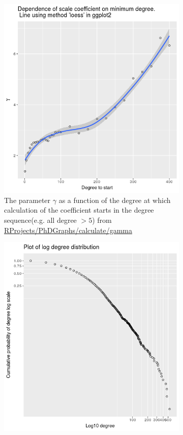 \begin{figure}
    \centering
    \begin{subfigure}[t]{0.45\textwidth}
        \centering
        \includegraphics[width=\linewidth]{images/dependence_of_scale_coefficient_on_min_degree.png} 
        \caption{The parameter $\gamma$ as a function of the degree at which calculation of the coefficient starts in the degree sequence(e.g. all degree $>5$) from \url{RProjects/PhDGraphs/calculate/gamma}} \label{fig:gamma}
    \end{subfigure}
    \hfill
    \begin{subfigure}[t]{0.45\textwidth}
        \centering
        \includegraphics[width=\linewidth]{images/plot_log_degree_distribution.png} 

\end{subfigure}
\end{figure}
